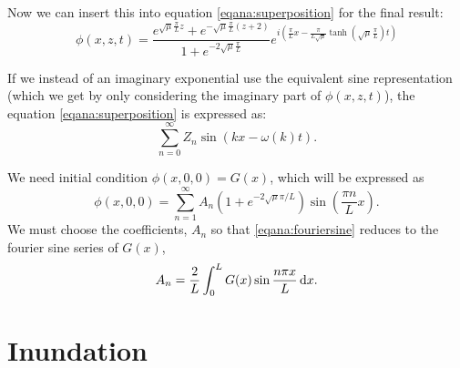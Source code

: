 \documentclass[11pt]{article}
\begin{document}
Now we can insert this into equation \eqref{eqana:superposition} for the final result:
\begin{equation*}
\phi(x,z,t) = \frac{ e^{ \sqrt{\mu} \frac{\pi }{L}z}  + e^{ -\sqrt{\mu}\frac{\pi }{L}(z+2)    }}{1 + e^{-2\sqrt{\mu}\frac{\pi }{L} }} e^{i \left( \frac{\pi }{L}x - \frac{\pi }{L\sqrt{\mu}} \tanh (\sqrt{\mu}\frac{\pi }{L})t \right)}
\end{equation*}

If we instead of an imaginary exponential use the equivalent sine representation (which we get by only considering the imaginary part of $\phi(x,z,t)$), the equation \eqref{eqana:superposition} is expressed as:
\begin{equation*}
\sum_{n=0}^\infty Z_n \sin \left(  kx-\omega(k)t  \right).
\end{equation*}

We need initial condition $\phi(x,0,0) = G(x)$, which will be expressed as
\begin{equation}
\label{eqana:fouriersine}
\phi(x,0,0) = \sum_{n=1}^\infty A_n \left( 1 + e^{-2\sqrt{\mu}\pi/L} \right) \sin \left( \frac{\pi n}{L}x \right).
\end{equation}
We must choose the coefficients, $A_n$ so that \eqref{eqana:fouriersine} reduces to the fourier sine series of $G(x)$,
\begin{equation*}
A_n = \frac{2}{L} \int_0^L G(x) \sin \frac{n \pi x}{L} \operatorname{d}\! x.
\end{equation*}
%
%
\section{Inundation}
%
%
\end{document}
